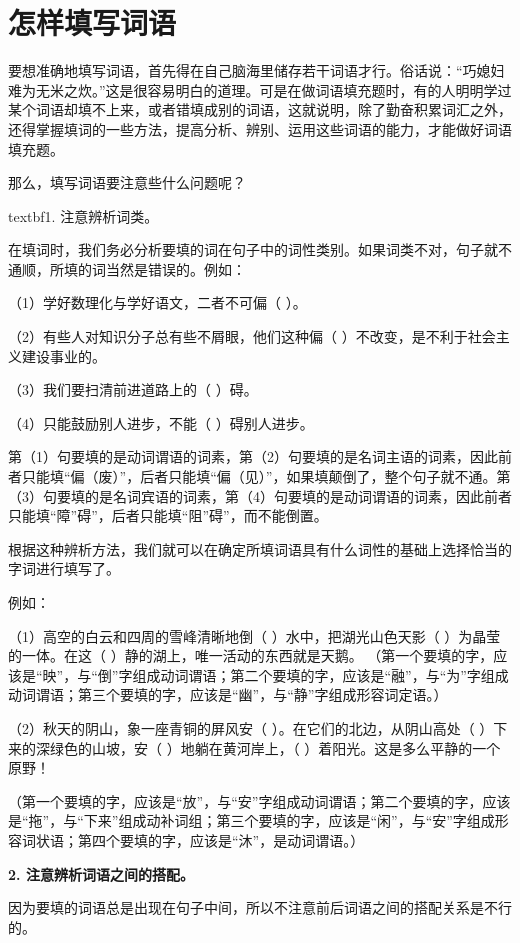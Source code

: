 \section{怎样填写词语}

要想准确地填写词语，首先得在自己脑海里储存若干词语才行。俗话说：“巧媳妇难为无米之炊。”这是很容易明白的道理。可是在做词语填充题时，有的人明明学过某个词语却填不上来，或者错填成别的词语，这就说明，除了勤奋积累词汇之外，还得掌握填词的一些方法，提高分析、辨别、运用这些词语的能力，才能做好词语填充题。

那么，填写词语要注意些什么问题呢？

textbf{1. 注意辨析词类。}

在填词时，我们务必分析要填的词在句子中的词性类别。如果词类不对，句子就不通顺，所填的词当然是错误的。例如：

（1）学好数理化与学好语文，二者不可偏（ ）。

（2）有些人对知识分子总有些不屑眼，他们这种偏（ ）不改变，是不利于社会主义建设事业的。

（3）我们要扫清前进道路上的（ ）碍。

（4）只能鼓励别人进步，不能（ ）碍别人进步。

第（1）句要填的是动词谓语的词素，第（2）句要填的是名词主语的词素，因此前者只能填“偏（废）”，后者只能填“偏（见）”，如果填颠倒了，整个句子就不通。第（3）句要填的是名词宾语的词素，第（4）句要填的是动词谓语的词素，因此前者只能填“障”碍”，后者只能填“阻”碍”，而不能倒置。

根据这种辨析方法，我们就可以在确定所填词语具有什么词性的基础上选择恰当的字词进行填写了。

例如：

（1）高空的白云和四周的雪峰清晰地倒（ ）水中，把湖光山色天影（ ）为晶莹的一体。在这（ ）静的湖上，唯一活动的东西就是天鹅。
（第一个要填的字，应该是“映”，与“倒”字组成动词谓语；第二个要填的字，应该是“融”，与“为”字组成动词谓语；第三个要填的字，应该是“幽”，与“静”字组成形容词定语。）

（2）秋天的阴山，象一座青铜的屏风安（ ）。在它们的北边，从阴山高处（ ）下来的深绿色的山坡，安（ ）地躺在黄河岸上，（ ）着阳光。这是多么平静的一个原野！

（第一个要填的字，应该是“放”，与“安”字组成动词谓语；第二个要填的字，应该是“拖”，与“下来”组成动补词组；第三个要填的字，应该是“闲”，与“安”字组成形容词状语；第四个要填的字，应该是“沐”，是动词谓语。）

\textbf{2. 注意辨析词语之间的搭配。}

因为要填的词语总是出现在句子中间，所以不注意前后词语之间的搭配关系是不行的。

